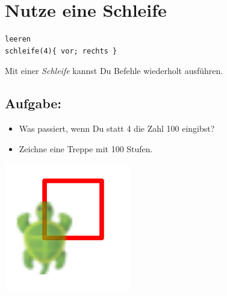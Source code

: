 \chapter{Nutze eine Schleife}
\begin{multicols}{2}

\begin{lstlisting}[basicstyle={\ttfamily\fontsize{30}{36}\selectfont},numbers=none]
leeren
schleife(4){ vor; rechts }
\end{lstlisting}
        
Mit einer {\it Schleife} kannst Du Befehle wiederholt ausführen.
\section*{\color{BrickRed}Aufgabe:}


\begin{itemize}

\item {Was passiert, wenn Du statt 4 die Zahl 100 eingibst?}
\item {Zeichne eine Treppe mit 100 Stufen.}

\end{itemize}



\columnbreak

\begin{center}
\includegraphics{../img/square.png}
\end{center}

\end{multicols}


